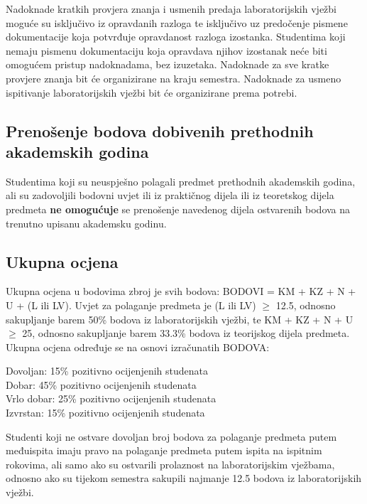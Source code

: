 \documentclass[times, 12pt, utf8]{book}
\newenvironment{myindentpar}[1]%
{\begin{list}{}%
         {\setlength{\leftmargin}{#1}}%
         \item[]%
}
{\end{list}}
\begin{document}
Nadoknade kratkih provjera znanja i usmenih predaja laboratorijskih vježbi moguće su isključivo iz opravdanih razloga te isključivo uz predočenje pismene dokumentacije koja potvrđuje opravdanost razloga izostanka.
Studentima koji nemaju pismenu dokumentaciju koja opravdava njihov izostanak neće biti omogućem pristup nadoknadama, bez izuzetaka.
Nadoknade za sve kratke provjere znanja bit će organizirane na kraju semestra.
Nadoknade za usmeno ispitivanje laboratorijskih vježbi bit će organizirane prema potrebi.

\cleardoublepage  
{}  
{}
\subsection*{Prenošenje bodova dobivenih prethodnih akademskih godina}

Studentima koji su neuspješno polagali predmet prethodnih akademskih godina, ali su zadovoljili bodovni uvjet ili iz praktičnog dijela ili iz teoretskog dijela predmeta \textbf{ne omogućuje} se prenošenje navedenog dijela ostvarenih bodova na trenutno upisanu akademsku godinu.

\cleardoublepage  
{}  
{}
\subsection*{Ukupna ocjena}

Ukupna ocjena u bodovima zbroj je svih bodova: BODOVI = KM + KZ + N + U + (L ili LV).
Uvjet za polaganje predmeta je (L ili LV) $\geq$ 12.5, odnosno sakupljanje barem 50\% bodova iz laboratorijskih vježbi, te KM + KZ + N + U $\geq$ 25, odnosno sakupljanje barem 33.3\% bodova iz teorijskog dijela predmeta. \\
Ukupna ocjena određuje se na osnovi izračunatih BODOVA:
\begin{myindentpar}{30pt}
Dovoljan: 15\% pozitivno ocijenjenih studenata \\
Dobar: 45\% pozitivno ocijenjenih studenata \\
Vrlo dobar: 25\% pozitivno ocijenjenih studenata \\
Izvrstan: 15\% pozitivno ocijenjenih studenata  
\end{myindentpar}

Studenti koji ne ostvare dovoljan broj bodova za polaganje predmeta putem međuispita imaju pravo na polaganje predmeta putem ispita na ispitnim rokovima, ali samo ako su ostvarili prolaznost na laboratorijskim vježbama, odnosno ako su tijekom semestra sakupili najmanje 12.5 bodova iz laboratorijskih vježbi.
\end{document}
